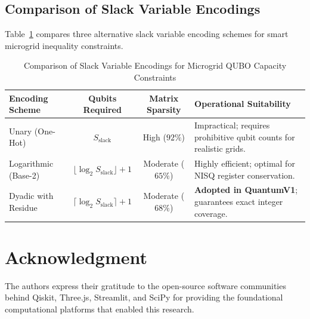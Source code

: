 \documentclass[11pt,a4paper]{article}
\theoremstyle{definition}
\theoremstyle{remark}
\begin{document}
\subsection{Comparison of Slack Variable Encodings}
Table~\ref{tab:slack_encodings} compares three alternative slack variable encoding schemes for smart microgrid inequality constraints.

\begin{table}[htbp]
\centering
\caption{Comparison of Slack Variable Encodings for Microgrid QUBO Capacity Constraints}
\label{tab:slack_encodings}
\begin{tabularx}{\columnwidth}{l c c X}
\toprule
\textbf{Encoding Scheme} & \textbf{Qubits Required} & \textbf{Matrix Sparsity} & \textbf{Operational Suitability} \\
\midrule
Unary (One-Hot) & $S_{\text{slack}}$ & High ($92\%$) & Impractical; requires prohibitive qubit counts for realistic grids. \\
Logarithmic (Base-2) & $\lfloor \log_2 S_{\text{slack}} \rfloor + 1$ & Moderate ($65\%$) & Highly efficient; optimal for NISQ register conservation. \\
Dyadic with Residue & $\lceil \log_2 S_{\text{slack}} \rceil + 1$ & Moderate ($68\%$) & \textbf{Adopted in QuantumV1}; guarantees exact integer coverage. \\
\bottomrule
\end{tabularx}
\end{table}

\section*{Acknowledgment}
The authors express their gratitude to the open-source software communities behind Qiskit, Three.js, Streamlit, and SciPy for providing the foundational computational platforms that enabled this research.
\end{document}
